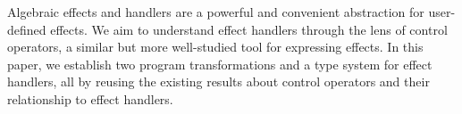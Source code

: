 Algebraic effects and handlers are a powerful and convenient abstraction
for user-defined effects.
We aim to understand effect handlers through the lens of control 
operators, a similar but more well-studied tool for expressing effects.
In this paper, we establish two program transformations and a type system
for effect handlers, all by reusing the existing results about control
operators and their relationship to effect handlers.
